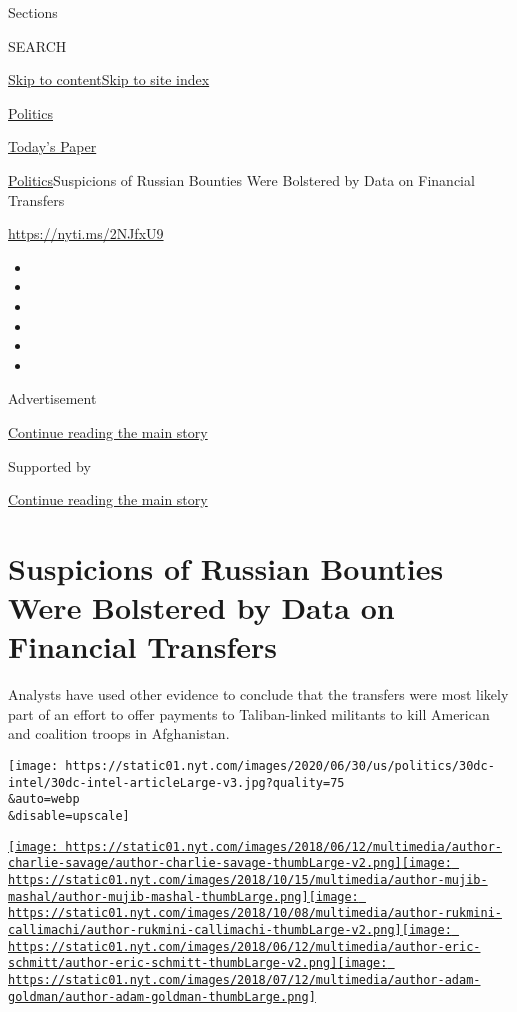 Sections

SEARCH

\protect\hyperlink{site-content}{Skip to
content}\protect\hyperlink{site-index}{Skip to site index}

\href{https://www.nytimes.com/section/politics}{Politics}

\href{https://myaccount.nytimes.com/auth/login?response_type=cookie\&client_id=vi}{}

\href{https://www.nytimes.com/section/todayspaper}{Today's Paper}

\href{/section/politics}{Politics}\textbar{}Suspicions of Russian
Bounties Were Bolstered by Data on Financial Transfers

\url{https://nyti.ms/2NJfxU9}

\begin{itemize}
\item
\item
\item
\item
\item
\item
\end{itemize}

Advertisement

\protect\hyperlink{after-top}{Continue reading the main story}

Supported by

\protect\hyperlink{after-sponsor}{Continue reading the main story}

\hypertarget{suspicions-of-russian-bounties-were-bolstered-by-data-on-financial-transfers}{%
\section{Suspicions of Russian Bounties Were Bolstered by Data on
Financial
Transfers}\label{suspicions-of-russian-bounties-were-bolstered-by-data-on-financial-transfers}}

Analysts have used other evidence to conclude that the transfers were
most likely part of an effort to offer payments to Taliban-linked
militants to kill American and coalition troops in Afghanistan.

\texttt{[image: https://static01.nyt.com/images/2020/06/30/us/politics/30dc-intel/30dc-intel-articleLarge-v3.jpg?quality=75\\\&auto=webp\\\&disable=upscale]}

\href{https://www.nytimes.com/by/charlie-savage}{\texttt{[image: https://static01.nyt.com/images/2018/06/12/multimedia/author-charlie-savage/author-charlie-savage-thumbLarge-v2.png]}}\href{https://www.nytimes.com/by/mujib-mashal}{\texttt{[image: https://static01.nyt.com/images/2018/10/15/multimedia/author-mujib-mashal/author-mujib-mashal-thumbLarge.png]}}\href{https://www.nytimes.com/by/rukmini-callimachi}{\texttt{[image: https://static01.nyt.com/images/2018/10/08/multimedia/author-rukmini-callimachi/author-rukmini-callimachi-thumbLarge-v2.png]}}\href{https://www.nytimes.com/by/eric-schmitt}{\texttt{[image: https://static01.nyt.com/images/2018/06/12/multimedia/author-eric-schmitt/author-eric-schmitt-thumbLarge-v2.png]}}\href{https://www.nytimes.com/by/adam-goldman}{\texttt{[image: https://static01.nyt.com/images/2018/07/12/multimedia/author-adam-goldman/author-adam-goldman-thumbLarge.png]}}

